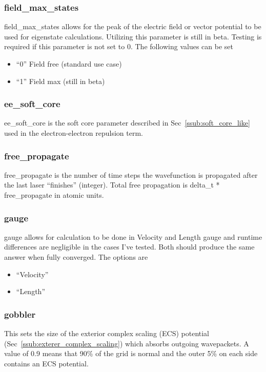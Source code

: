 \documentclass{article}
\begin{document}
\subsubsection{field\_max\_states}
field\_max\_states allows for the peak of the electric field or vector potential to be used for eigenstate calculations. Utilizing this parameter is still in beta. Testing is required if this parameter is not set to 0. The following values can be set
\begin{itemize}
  \item ``0'' Field free (standard use case)
  \item ``1'' Field max (still in beta)
\end{itemize}

\subsubsection{ee\_soft\_core}
ee\_soft\_core is the soft core parameter described in Sec~\ref{ssub:soft_core_like} used in the electron-electron repulsion term.

\subsubsection{free\_propagate}
free\_propagate is the number of time steps the wavefunction is propagated after the last laser ``finishes'' (integer). Total free propagation is delta\_t * free\_propagate in atomic units.

\subsubsection{gauge}
gauge allows for calculation to be done in Velocity and Length gauge and runtime differences are negligible in the cases I've tested. Both should produce the same answer when fully converged. The options are
\begin{itemize}
  \item ``Velocity''
  \item ``Length''
\end{itemize}

\subsubsection{gobbler}
This sets the size of the exterior complex scaling (ECS) potential (Sec~\ref{ssub:exterer_complex_scaling}) which absorbs outgoing wavepackets. A value of 0.9 means that 90\% of the grid is normal and the outer 5\% on each side contains an ECS potential.
\end{document}
